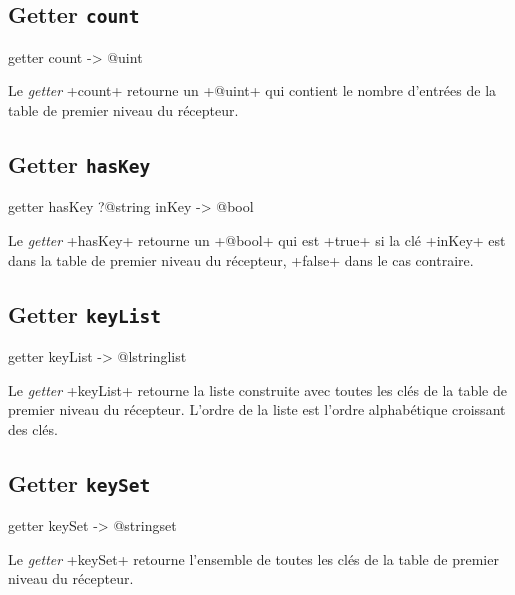 \subsection{Getter \texttt{count}}

\begin{galgas3}
getter count -> @uint
\end{galgas3}


Le \emph{getter} \ggst+count+ retourne un \ggst+@uint+ qui contient le nombre d'entrées de la table de premier niveau du récepteur.



\subsection{Getter \texttt{hasKey}}

\begin{galgas3}
getter hasKey ?@string inKey -> @bool
\end{galgas3}


Le \emph{getter} \ggst+hasKey+ retourne un \ggst+@bool+ qui est \ggst+true+ si la clé \ggst+inKey+ est dans la table de premier niveau du récepteur, \ggst+false+ dans le cas contraire.



\subsection{Getter \texttt{keyList}}

\begin{galgas3}
getter keyList -> @lstringlist
\end{galgas3}


Le \emph{getter} \ggst+keyList+ retourne la liste construite avec toutes les clés de la table de premier niveau du récepteur. L'ordre de la liste est l'ordre alphabétique croissant des clés.



\subsection{Getter \texttt{keySet}}

\begin{galgas3}
getter keySet -> @stringset
\end{galgas3}


Le \emph{getter} \ggst+keySet+ retourne l'ensemble de toutes les clés de la table de premier niveau du récepteur.





